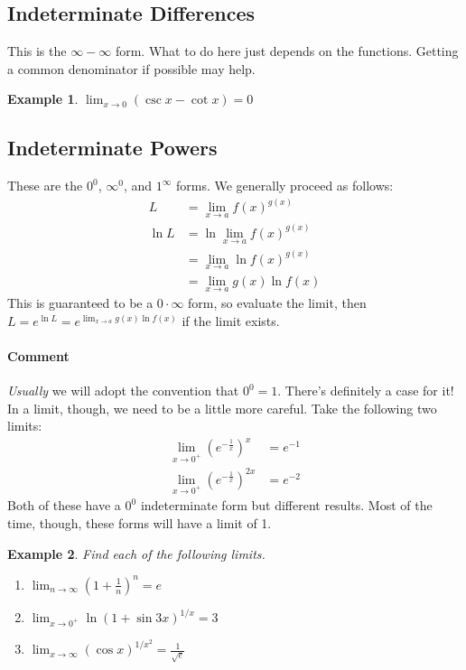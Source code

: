 \documentclass[letterpaper, 11pt, openany]{book}
\theoremstyle{mytheoremstyle}
\theoremstyle{myexamplestyle}
\newtheorem{example}{Example}[section]
\newenvironment{commentary}{\paragraph{\sffamily \smaller \fontseries{b}\selectfont Comment}}{}
\begin{document}
\subsection{Indeterminate Differences}
This is the \(\infty - \infty\) form. What to do here just depends on the functions. Getting a common denominator if possible may help.

\begin{example}
    \(\displaystyle \lim_{x \to 0} \left(\csc x - \cot x\right) = 0\)
\end{example}

\subsection{Indeterminate Powers}
These are the \(0^{0}\), \(\infty^{0}\), and \(1^{\infty}\) forms. We generally proceed as follows:
\begin{align*}
    L       &= \lim_{x \to a} f(x)^{g(x)} \\
    \ln L   &= \ln \lim_{x \to a} f(x)^{g(x)}\\
            &= \lim_{x \to a} \ln f(x)^{g(x)}\\
            &= \lim_{x \to a} g(x)\ln f(x)
\end{align*}
This is guaranteed to be a \(0 \cdot \infty\) form, so evaluate the limit, then \(\displaystyle L = e^{\ln L} = e^{\lim_{x \to a} g(x)\ln f(x)}\) if the limit exists.

\begin{commentary}
    \textit{Usually} we will adopt the convention that \(0^0 = 1\). There's definitely a case for it! In a limit, though, we need to be a little more careful. Take the following two limits:
    \begin{align*}
        \lim_{x \to 0^+} \left(e^{-\frac{1}{x}}\right)^{x} &= e^{-1}\\
        \lim_{x \to 0^+} \left(e^{-\frac{1}{x}}\right)^{2x} &= e^{-2}
    \end{align*}
    Both of these have a \(0^0\) indeterminate form but different results. Most of the time, though, these forms will have a limit of 1.
\end{commentary}

\begin{example}
    Find each of the following limits.
    \begin{enumerate}
        \item \(\displaystyle \lim_{n \to \infty} \left(1 + \frac{1}{n}\right)^n = e\)
        \item \(\displaystyle \lim_{x \to 0^+} \ln (1 + \sin 3x)^{1/x} = 3\)
        \item \(\displaystyle \lim_{x \to \infty} (\cos x)^{1/x^2} = \frac{1}{\sqrt{e}}\)
    \end{enumerate}
\end{example}
\end{document}
